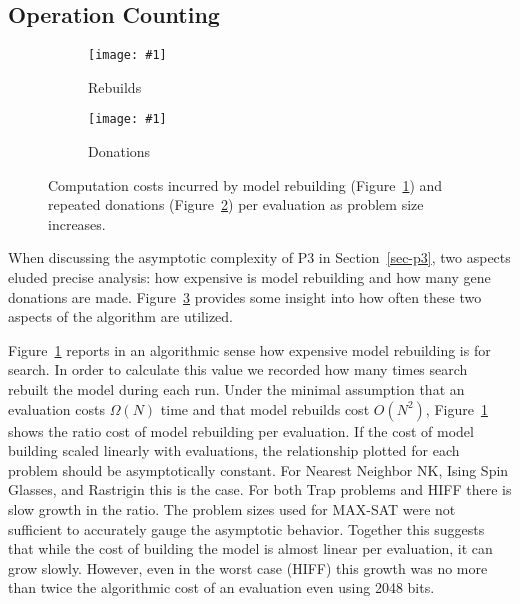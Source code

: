 \documentclass[twoside]{article}
\newcommand{\includegraphicsfit}[1]
{\texttt{[image: \#1]}}
\begin{document}
\subsection{Operation Counting}
\begin{figure}[t]
  \begin{centering}
    \begin{subfigure}{.5\textwidth}
      \begin{centering}
        \includegraphicsfit{rebuilds}
      \end{centering}
      \caption{Rebuilds}
      \label{fig-rebuilds}
    \end{subfigure}%
    \begin{subfigure}{.5\textwidth}
      \begin{centering}
        \includegraphicsfit{donations}
      \end{centering}
      \caption{Donations}
      \label{fig-donations}
    \end{subfigure}
  \end{centering}
  \caption{Computation costs incurred by model rebuilding (Figure~\ref{fig-rebuilds}) and
           repeated donations (Figure~\ref{fig-donations}) per evaluation as problem size increases.}
  \label{fig-costs}
\end{figure}

When discussing the asymptotic complexity of P3 in Section~\ref{sec-p3}, two aspects eluded precise
analysis: how expensive is model rebuilding and how many gene donations are made. Figure~\ref{fig-costs}
provides some insight into how often these two aspects of the algorithm are utilized.

Figure~\ref{fig-rebuilds} reports in an algorithmic sense how expensive model rebuilding is for search.
In order to calculate this value we recorded how many times search rebuilt the model during each run.
Under the minimal assumption that an evaluation costs $\Omega(N)$ time and that model rebuilds cost $O(N^2)$,
Figure~\ref{fig-rebuilds} shows the ratio cost of model rebuilding per evaluation. If the cost of model building
scaled linearly with evaluations, the relationship plotted for each problem should be asymptotically constant.
For Nearest Neighbor NK, Ising Spin Glasses, and Rastrigin this is the case. For both Trap problems
and HIFF there is slow growth in the ratio. The problem sizes used for MAX-SAT were not sufficient
to accurately gauge the asymptotic behavior. Together this suggests that while the cost of building the model
is almost linear per evaluation, it can grow slowly. However, even in the worst case (HIFF) this growth was
no more than twice the algorithmic cost of an evaluation even using 2048 bits.
\end{document}
